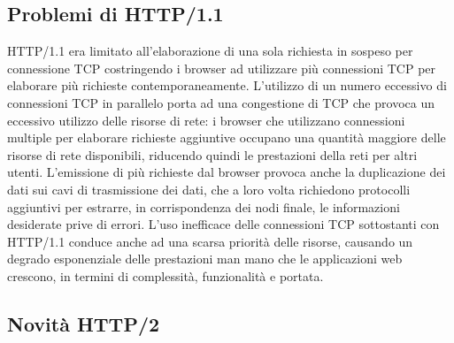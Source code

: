\documentclass[a4paper,11pt]{article}
\begin{document}
\subsection{Problemi di HTTP/1.1}
HTTP/1.1 era limitato all’elaborazione di una sola richiesta in sospeso per connessione TCP costringendo i browser ad utilizzare più connessioni TCP per elaborare più richieste contemporaneamente.\newline
L’utilizzo di un numero eccessivo di connessioni TCP in parallelo porta ad una congestione di TCP che provoca un eccessivo utilizzo delle risorse di rete: i browser che utilizzano connessioni multiple per elaborare richieste aggiuntive occupano una quantità maggiore delle risorse di rete disponibili, riducendo quindi le prestazioni della reti per altri utenti.\newline
L’emissione di più richieste dal browser provoca anche la duplicazione dei dati sui cavi di trasmissione dei dati, che a loro volta richiedono protocolli aggiuntivi per estrarre, in corrispondenza dei nodi finale, le informazioni desiderate prive di errori.\newline
L’uso inefficace delle connessioni TCP sottostanti con HTTP/1.1 conduce anche ad una scarsa priorità delle risorse, causando un degrado esponenziale delle prestazioni man mano che le applicazioni web crescono, in termini di complessità, funzionalità e portata.
\subsection{Novità HTTP/2}
\end{document}
